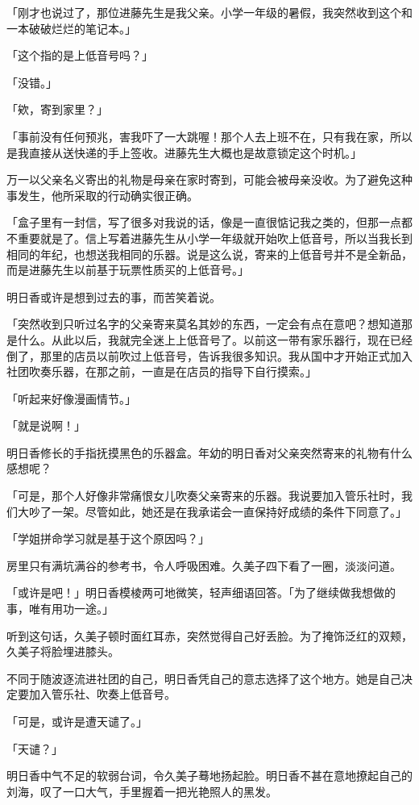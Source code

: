 \documentclass[UTF8]{ctexart}
\begin{document}
    「刚才也说过了，那位进藤先生是我父亲。小学一年级的暑假，我突然收到这个和一本破破烂烂的笔记本。」 

    「这个指的是上低音号吗？」 

    「没错。」 

    「欸，寄到家里？」 

    「事前没有任何预兆，害我吓了一大跳喔！那个人去上班不在，只有我在家，所以是我直接从送快递的手上签收。进藤先生大概也是故意锁定这个时机。」 

    万一以父亲名义寄出的礼物是母亲在家时寄到，可能会被母亲没收。为了避免这种事发生，他所采取的行动确实很正确。 

    「盒子里有一封信，写了很多对我说的话，像是一直很惦记我之类的，但那一点都不重要就是了。信上写着进藤先生从小学一年级就开始吹上低音号，所以当我长到相同的年纪，也想送我相同的乐器。说是这么说，寄来的上低音号并不是全新品，而是进藤先生以前基于玩票性质买的上低音号。」 

    明日香或许是想到过去的事，而苦笑着说。 

    「突然收到只听过名字的父亲寄来莫名其妙的东西，一定会有点在意吧？想知道那是什么。从此以后，我就完全迷上上低音号了。以前这一带有家乐器行，现在已经倒了，那里的店员以前吹过上低音号，告诉我很多知识。我从国中才开始正式加入社团吹奏乐器，在那之前，一直是在店员的指导下自行摸索。」 

    「听起来好像漫画情节。」 

    「就是说啊！」 

    明日香修长的手指抚摸黑色的乐器盒。年幼的明日香对父亲突然寄来的礼物有什么感想呢？ 

    「可是，那个人好像非常痛恨女儿吹奏父亲寄来的乐器。我说要加入管乐社时，我们大吵了一架。尽管如此，她还是在我承诺会一直保持好成绩的条件下同意了。」 

    「学姐拼命学习就是基于这个原因吗？」 

    房里只有满坑满谷的参考书，令人呼吸困难。久美子四下看了一圈，淡淡问道。 

    「或许是吧！」明日香模棱两可地微笑，轻声细语回答。「为了继续做我想做的事，唯有用功一途。」 

    听到这句话，久美子顿时面红耳赤，突然觉得自己好丢脸。为了掩饰泛红的双颊，久美子将脸埋进膝头。 

    不同于随波逐流进社团的自己，明日香凭自己的意志选择了这个地方。她是自己决定要加入管乐社、吹奏上低音号。 

    「可是，或许是遭天谴了。」 

    「天谴？」 

    明日香中气不足的软弱台词，令久美子蓦地扬起脸。明日香不甚在意地撩起自己的刘海，叹了一口大气，手里握着一把光艳照人的黑发。 
\end{document}
